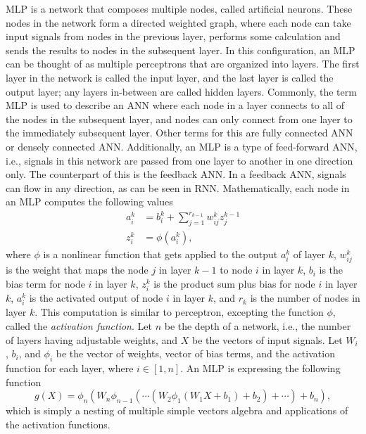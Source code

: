 \gls{MLP} is a network that composes multiple nodes, called artificial neurons.
These nodes in the network form a directed weighted graph, where each node can take input signals from nodes in the previous layer, performs some calculation and sends the results to nodes in the subsequent layer.
In this configuration, an \gls{MLP} can be thought of as multiple perceptrons that are organized into layers.
The first layer in the network is called the input layer, and the last layer is called the output layer; any layers in-between are called hidden layers.
Commonly, the term \gls{MLP} is used to describe an \gls{ANN} where each node in a layer connects to all of the nodes in the subsequent layer, and nodes can only connect from one layer to the immediately subsequent layer.
Other terms for this are fully connected \gls{ANN} or densely connected \gls{ANN}.
Additionally, an \gls{MLP} is a type of feed-forward \gls{ANN}, i.e., signals in this network are passed from one layer to another in one direction only.
The counterpart of this is the feedback \gls{ANN}.
In a feedback \gls{ANN}, signals can flow in any direction, as can be seen in \gls{RNN}.
Mathematically, each node in an \gls{MLP} computes the following values
\begin{align*}
    a_i^k &= b_i^k + \sum_{j=1}^{r_{k-1}} w_{ij}^k z_j^{k-1} \\
    z_i^k &= \phi (a_i^k),
\end{align*}
where $\phi$ is a nonlinear function that gets applied to the output $a_i^k$ of layer $k$, $w_{ij}^k$ is the weight that maps the node $j$ in layer $k - 1$ to node $i$ in layer $k$, $b_i$ is the bias term for node $i$ in layer $k$, $z_i^k$ is the product sum plus bias for node $i$ in layer $k$, $a_i^k$ is the activated output of node $i$ in layer $k$, and $r_k$ is the number of nodes in layer $k$.
This computation is similar to perceptron, excepting the function $\phi$, called the \textit{activation function}.
Let $n$ be the depth of a network, i.e., the number of layers having adjustable weights, and $X$ be the vectors of input signals.
Let $W_i$, $b_i$, and $\phi_i$ be the vector of weights, vector of bias terms, and the activation function for each layer, where $i \in [1, n]$.
An \gls{MLP} is expressing the following function
\begin{equation*}
    g(X) = \phi_n(W_n \phi_{n - 1}(\cdots (W_2 \phi_1(W_1 X + b_1) + b_2) + \cdots) + b_n),
\end{equation*}
which is simply a nesting of multiple simple vectors algebra and applications of the activation functions.

